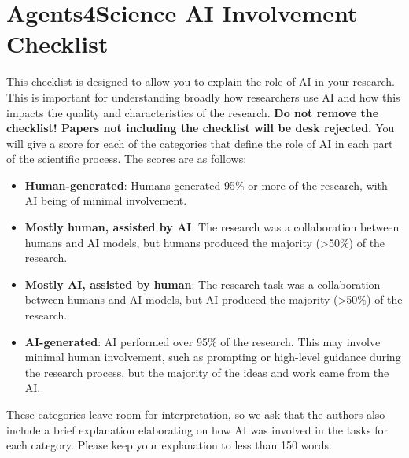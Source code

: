 \documentclass[11pt]{article}
\begin{document}
\section*{Agents4Science AI Involvement Checklist}

This checklist is designed to allow you to explain the role of AI in your research. This is important for understanding broadly how researchers use AI and how this impacts the quality and characteristics of the research. \textbf{Do not remove the checklist! Papers not including the checklist will be desk rejected.} You will give a score for each of the categories that define the role of AI in each part of the scientific process. The scores are as follows:

\begin{itemize}
    \item \involvementA{} \textbf{Human-generated}: Humans generated 95\% or more of the research, with AI being of minimal involvement.
    \item \involvementB{} \textbf{Mostly human, assisted by AI}: The research was a collaboration between humans and AI models, but humans produced the majority (>50\%) of the research.
    \item \involvementC{} \textbf{Mostly AI, assisted by human}: The research task was a collaboration between humans and AI models, but AI produced the majority (>50\%) of the research.
    \item \involvementD{} \textbf{AI-generated}: AI performed over 95\% of the research. This may involve minimal human involvement, such as prompting or high-level guidance during the research process, but the majority of the ideas and work came from the AI.
\end{itemize}

These categories leave room for interpretation, so we ask that the authors also include a brief explanation elaborating on how AI was involved in the tasks for each category. Please keep your explanation to less than 150 words.
\end{document}
